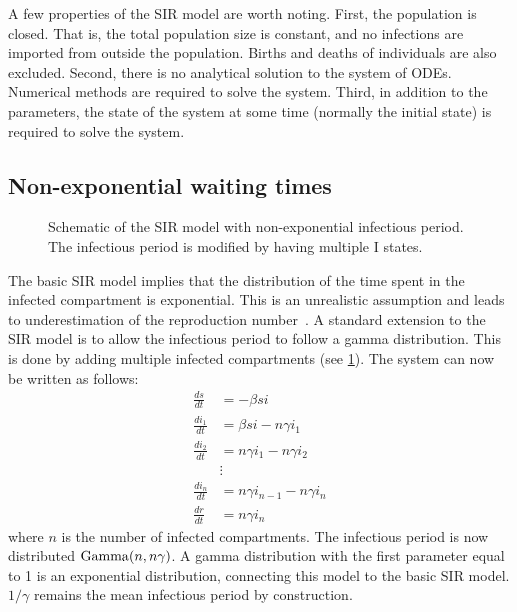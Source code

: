 \documentclass[thesis.tex]{subfiles}
\begin{document}
A few properties of the SIR model are worth noting.
First, the population is closed.
That is, the total population size is constant, and no infections are imported from outside the population.
Births and deaths of individuals are also excluded.
Second, there is no analytical solution to the system of ODEs.
Numerical methods are required to solve the system.
Third, in addition to the parameters, the state of the system at some time (normally the initial state) is required to solve the system.


\subsection{Non-exponential waiting times} \label{SEIR:sec:non-exponential}
\begin{figure}[h]
  \caption[The SIR model with non-exponential infectious period]{Schematic of the SIR model with non-exponential infectious period. The infectious period is modified by having multiple I states.}
  \label{SEIR:fig:SIR-gamma}
\end{figure}

The basic SIR model implies that the distribution of the time spent in the infected compartment is exponential.
This is an unrealistic assumption and leads to underestimation of the reproduction number~\autocites{lloydRealistic}{wearingAppropriate}.
A standard extension to the SIR model is to allow the infectious period to follow a gamma distribution.
This is done by adding multiple infected compartments (see \cref{SEIR:fig:SIR-gamma}).
The system can now be written as follows:
\begin{align}
\frac{ds}{dt} &= -\beta si \\
\frac{di_1}{dt} &= \beta si - n\gamma i_1 \\
\frac{di_2}{dt} &= n\gamma i_1 - n \gamma i_2 \\
&\vdots \nonumber \\
\frac{di_n}{dt} &= n\gamma i_{n-1} - n \gamma i_n \\
\frac{dr}{dt} &= n\gamma i_n
\end{align}
where $n$ is the number of infected compartments.
The infectious period is now distributed $\operatorname{Gamma}(n, n\gamma)$.
A gamma distribution with the first parameter equal to 1 is an exponential distribution, connecting this model to the basic SIR model.
$1/\gamma$ remains the mean infectious period by construction.
\end{document}
